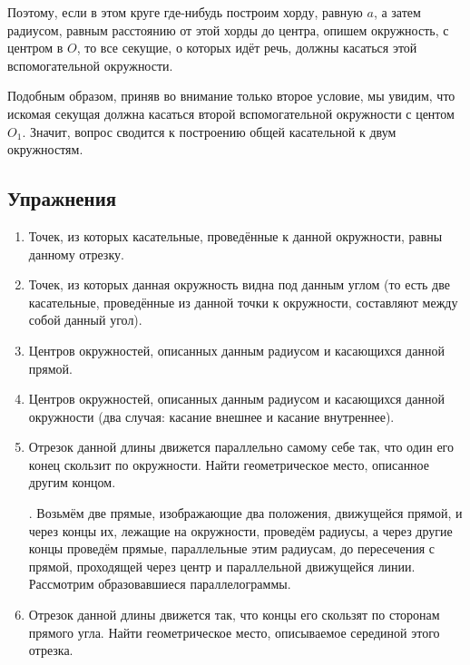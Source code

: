 \documentclass[twoside]{book}
\begin{document}
Поэтому, если в этом круге где-нибудь построим хорду, равную $a$, а затем радиусом, равным расстоянию от этой хорды до центра, опишем окружность, с центром в $O$, то все секущие, о которых идёт речь, должны касаться этой вспомогательной окружности.

Подобным образом, приняв во внимание только второе условие, мы увидим, что искомая секущая должна касаться второй вспомогательной окружности с центом $O_1$.
Значит, вопрос сводится к построению общей касательной к двум окружностям.

\subsection*{Упражнения}

\begin{center}
\end{center}

\begin{enumerate}

 \item
 {\sloppy
Точек, из которых касательные, проведённые к данной окружности, равны данному отрезку.

}
 
 \item

Точек, из которых данная окружность видна под данным углом (то есть две касательные, проведённые из данной точки к окружности, составляют между собой данный угол).



 \item
Центров окружностей, описанных данным радиусом и касающихся данной прямой.

 \item
Центров окружностей, описанных данным радиусом и касающихся данной окружности (два случая:
касание внешнее и касание внутреннее).

 \item
Отрезок данной длины движется параллельно самому себе так, что один его конец скользит по окружности.
Найти геометрическое место, описанное другим концом.

\smallskip
{}.
Возьмём две прямые, изображающие два положения, движущейся прямой, и через концы их, лежащие на окружности, проведём радиусы, а через другие концы проведём прямые, параллельные этим радиусам, до пересечения с прямой, проходящей через центр и параллельной движущейся линии.
Рассмотрим образовавшиеся параллелограммы.

 \item
Отрезок данной длины движется так, что концы его скользят по сторонам прямого угла.
Найти геометрическое место, описываемое серединой этого отрезка.

\end{enumerate}
\end{document}
